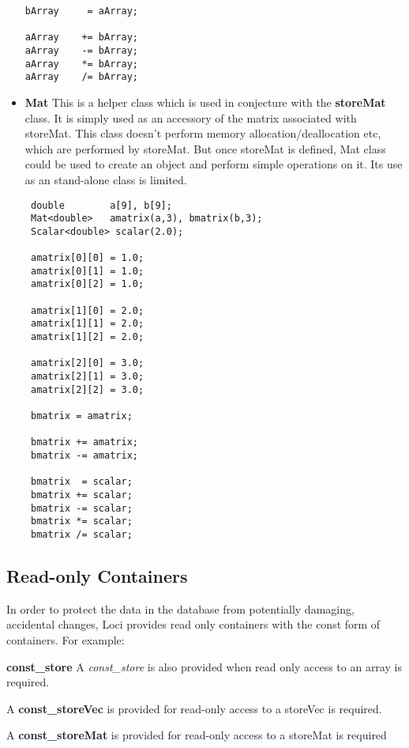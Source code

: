 \begin{itemize}
\begin{verbatim}
bArray     = aArray;

aArray    += bArray;
aArray    -= bArray;
aArray    *= bArray;
aArray    /= bArray;
\end{verbatim}
%
\item {\bf Mat} This is a helper class which is used in conjecture with the {\bf
storeMat} class. It is simply used as an accessory of the matrix associated
with storeMat. This class doesn't perform memory allocation/deallocation
etc, which are performed by storeMat. But once storeMat is defined, Mat class
could be used to create an object and perform simple operations on it. Its
use as an stand-alone class is limited.
%
\begin{verbatim}
 double        a[9], b[9];
 Mat<double>   amatrix(a,3), bmatrix(b,3);
 Scalar<double> scalar(2.0);

 amatrix[0][0] = 1.0;
 amatrix[0][1] = 1.0;
 amatrix[0][2] = 1.0;

 amatrix[1][0] = 2.0;
 amatrix[1][1] = 2.0;
 amatrix[1][2] = 2.0;

 amatrix[2][0] = 3.0;
 amatrix[2][1] = 3.0;
 amatrix[2][2] = 3.0;

 bmatrix = amatrix;

 bmatrix += amatrix;
 bmatrix -= amatrix;

 bmatrix  = scalar;
 bmatrix += scalar;
 bmatrix -= scalar;
 bmatrix *= scalar;
 bmatrix /= scalar;
\end{verbatim}
\end{itemize}
%
\subsection { Read-only Containers }
\par In order to protect the data in the database from potentially damaging,
accidental changes, Loci provides read only containers with the const form of
containers. For example: 
%  
\par {\bf const\_store }A {\em const\_store} is also provided when
read only access to an array is required.
%  
\par A {\bf const\_storeVec} is  provided for read-only access to a storeVec is required.
\par A {\bf const\_storeMat} is provided for read-only access to a storeMat is required

